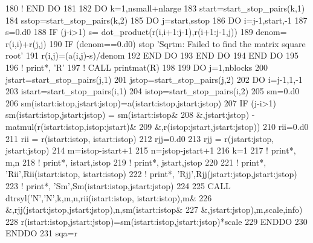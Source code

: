 \begin{DoxyCode}
180     \textcolor{comment}{! END DO}
181     
182     \textcolor{keywordflow}{DO} k=1,nsmall+nlarge
183        start=start\_stop\_pairs(k,1)
184        sstop=start\_stop\_pairs(k,2)
185        \textcolor{keywordflow}{DO} j=start,sstop
186           \textcolor{keywordflow}{DO} i=j-1,start,-1
187              s=0.d0
188              \textcolor{keywordflow}{IF} (j-i>1) s= dot\_product(r(i,i+1:j-1),r(i+1:j-1,j))
189              denom= r(i,i)+r(j,j)
190              \textcolor{keywordflow}{IF} (denom==0.d0) stop \textcolor{stringliteral}{'Sqrtm: Failed to find the matrix square root'}
191              r(i,j)=(a(i,j)-s)/denom
192 \textcolor{keywordflow}{          END DO}
193 \textcolor{keywordflow}{       END DO}
194 \textcolor{keywordflow}{    END DO}
195 
196     \textcolor{comment}{! print*, 'R'}
197     \textcolor{comment}{! CALL printmat(R)}
198     
199     \textcolor{keywordflow}{DO} j=1,nblocks
200        jstart=start\_stop\_pairs(j,1)
201        jstop=start\_stop\_pairs(j,2)
202        \textcolor{keywordflow}{DO} i=j-1,1,-1
203           istart=start\_stop\_pairs(i,1)
204           istop=start\_stop\_pairs(i,2)
205           sm=0.d0
206           sm(istart:istop,jstart:jstop)=a(istart:istop,jstart:jstop)
207           \textcolor{keywordflow}{IF} (j-i>1) sm(istart:istop,jstart:jstop) = sm(istart:istop&
208                &,jstart:jstop) - matmul(r(istart:istop,istop:jstart)&
209                &,r(istop:jstart,jstart:jstop))
210           rii=0.d0
211           rii = r(istart:istop, istart:istop)
212           rjj=0.d0
213           rjj = r(jstart:jstop, jstart:jstop)
214           m=istop-istart+1
215           n=jstop-jstart+1
216           k=1
217           \textcolor{comment}{! print*, m,n}
218           \textcolor{comment}{! print*, istart,istop}
219           \textcolor{comment}{! print*, jstart,jstop}
220 
221           \textcolor{comment}{! print*, 'Rii',Rii(istart:istop, istart:istop)}
222           \textcolor{comment}{! print*, 'Rjj',Rjj(jstart:jstop,jstart:jstop)}
223           \textcolor{comment}{! print*, 'Sm',Sm(istart:istop,jstart:jstop)}
224 
225           \textcolor{keyword}{CALL }dtrsyl(\textcolor{stringliteral}{'N'},\textcolor{stringliteral}{'N'},k,m,n,rii(istart:istop, istart:istop),m&
226                &,rjj(jstart:jstop,jstart:jstop),n,sm(istart:istop&
227                &,jstart:jstop),m,scale,info)
228           r(istart:istop,jstart:jstop)=sm(istart:istop,jstart:jstop)*scale
229 \textcolor{keywordflow}{       ENDDO}
230 \textcolor{keywordflow}{    ENDDO}
231     sqa=r
\end{DoxyCode}


